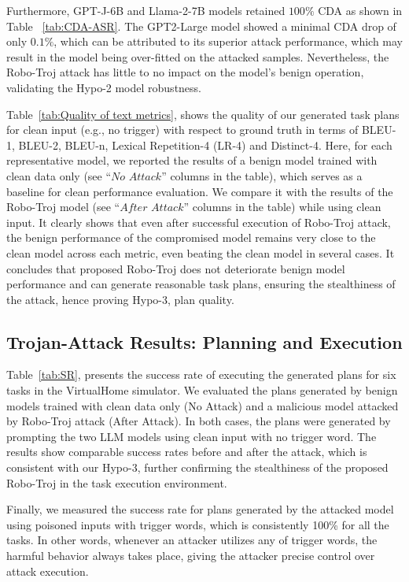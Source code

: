 \documentclass{article}
\begin{document}
Furthermore, GPT-J-6B and Llama-2-7B models retained $100\%$ CDA as shown in Table ~\ref{tab:CDA-ASR}. The GPT2-Large model showed a minimal CDA drop of only $0.1\%$, which can be attributed to its superior attack performance, which may result in the model being over-fitted on the attacked samples. Nevertheless, the Robo-Troj attack has little to no impact on the model's benign operation, validating the Hypo-2 model robustness. 

Table~\ref{tab:Quality of text metrics}, shows the quality of our generated task plans for clean input (e.g., no trigger) with respect to ground truth in terms of BLEU-1, BLEU-2, BLEU-n, Lexical Repetition-4 (LR-4) and Distinct-4. Here, for each representative model, we reported the results of a benign model trained with clean data only (see ``$\textit{No Attack}$'' columns in the table), which serves as a baseline for clean performance evaluation. We compare it with the results of the Robo-Troj model (see ``$\textit{After Attack}$'' columns in the table) while using clean input. It clearly shows that even after successful execution of Robo-Troj attack, the benign performance of the compromised model remains very close to the clean model across each metric, even beating the clean model in several cases. It concludes that proposed Robo-Troj does not deteriorate benign model performance and can generate reasonable task plans, ensuring the stealthiness of the attack, hence proving Hypo-3, plan quality.

\subsection{Trojan-Attack Results: Planning and Execution}
\label{sec:planexe}

Table~\ref{tab:SR}, presents the success rate of executing the generated plans for six tasks in the VirtualHome simulator. 
We evaluated the plans generated by benign models trained with clean data only (No Attack) and a malicious model attacked by Robo-Troj attack (After Attack). 
In both cases, the plans were generated by prompting the two LLM models using clean input with no trigger word. 
The results show comparable success rates before and after the attack, which is consistent with our Hypo-3, further confirming the stealthiness of the proposed Robo-Troj in the task execution environment. 

Finally, we measured the success rate for plans generated by the attacked model using poisoned inputs with trigger words, which is consistently 100\% for all the tasks.
In other words, whenever an attacker utilizes any of trigger words, the harmful behavior always takes place, giving the attacker precise control over attack execution. 
\end{document}
